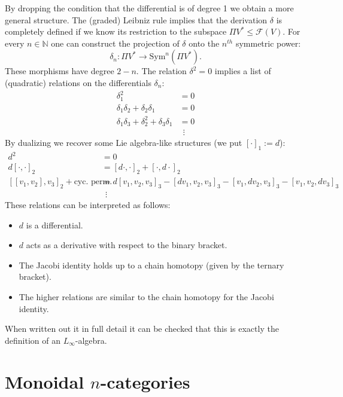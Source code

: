 
    By dropping the condition that the differential is of degree 1 we obtain a more general structure. The (graded) Leibniz rule implies that the derivation $\delta$ is completely defined if we know its restriction to the subspace $\Pi V^*\leq\mathcal{F}(V)$. For every $n\in\mathbb{N}$ one can construct the projection of $\delta$ onto the $n^{th}$ symmetric power: \[\delta_n:\Pi V^*\rightarrow\text{Sym}^n(\Pi V^*).\] These morphisms have degree $2-n$. The relation $\delta^2=0$ implies a list of (quadratic) relations on the differentials $\delta_n$:
    \begin{align*}
        \delta_1^2 &= 0\\
        \delta_1\delta_2+\delta_2\delta_1 &= 0\\
        \delta_1\delta_3+\delta_2^2+\delta_3\delta_1 &= 0\\
        &\ \ \vdots
    \end{align*}
    By dualizing we recover some Lie algebra-like structures (we put $[\cdot]_1:=d$):
    \begin{align*}
        d^2&=0\\
        d[\cdot,\cdot]_2 &= [d\cdot,\cdot]_2+[\cdot,d\cdot]_2\\
        [[v_1,v_2],v_3]_2+\text{cyc. perm.} &= d[v_1,v_2,v_3]_3-[dv_1,v_2,v_3]_3-[v_1,dv_2,v_3]_3-[v_1,v_2,dv_3]_3\\
        &\ \ \vdots
    \end{align*}
    These relations can be interpreted as follows:
    \begin{itemize}
        \item $d$ is a differential.
        \item $d$ acts as a derivative with respect to the binary bracket.
        \item The Jacobi identity holds up to a chain homotopy (given by the ternary bracket).
        \item The higher relations are similar to the chain homotopy for the Jacobi identity.
    \end{itemize}
    When written out it in full detail it can be checked that this is exactly the definition of an $L_\infty$-algebra.

\section{\texorpdfstring{Monoidal $n$-categories}{Monoidal n-categories}}\label{section:monoidal_n_cat}

